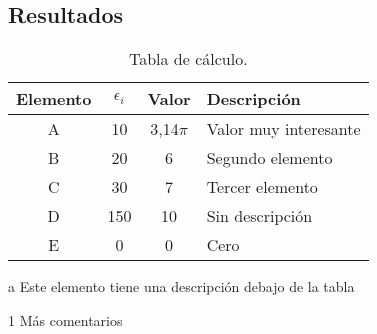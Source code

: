 \begin{appendixs}
	\subsection{Resultados}
	\lipsum[10]

	\enabletablerowcolor[2] %
	\begin{table}[H]
		\begin{threeparttable}
		\centering
		\caption{Tabla de cálculo.}
		\begin{tabular}{cccC{4cm}}
			\hline
			\textbf{Elemento} & $\epsilon_i$ & \textbf{Valor} & \textbf{Descripción} \bigstrut \\
			\hline
			A     & 10    & 3,14$\pi$ & Valor muy interesante \\
			B     & 20    & 6 & Segundo elemento \\
			C     & 30    & 7 & Tercer elemento \\
			D     & 150    & 10 & Sin descripción \\
			E     & 0    & 0 & Cero \\
			\hline
			\end{tabular}
		\begin{tablenotes}
			\item[a] Este elemento tiene una descripción debajo de la tabla
			\item[1] Más comentarios
		\end{tablenotes}
		\end{threeparttable}
		\label{tab:anexo-1}
	\end{table}
	\disabletablerowcolor %

\end{appendixs}